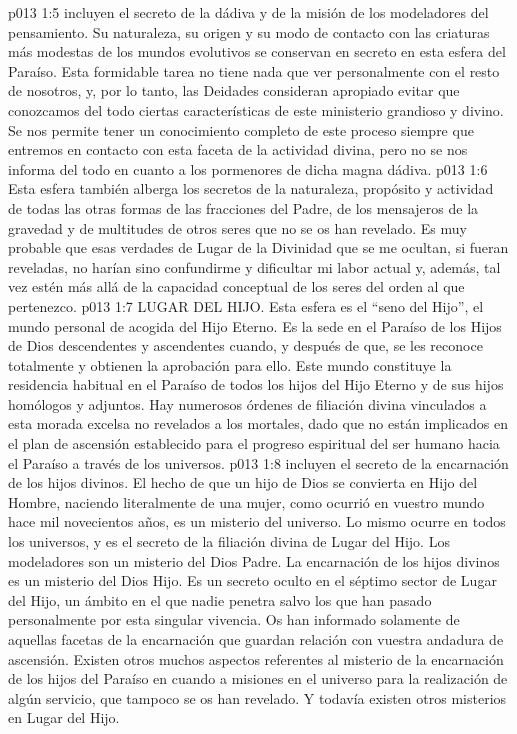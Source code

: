 \vs p013 1:5 \pc {} incluyen el secreto de la dádiva y de la misión de los modeladores del pensamiento. Su naturaleza, su origen y su modo de contacto con las criaturas más modestas de los mundos evolutivos se conservan en secreto en esta esfera del Paraíso. Esta formidable tarea no tiene nada que ver personalmente con el resto de nosotros, y, por lo tanto, las Deidades consideran apropiado evitar que conozcamos del todo ciertas características de este ministerio grandioso y divino. Se nos permite tener un conocimiento completo de este proceso siempre que entremos en contacto con esta faceta de la actividad divina, pero no se nos informa del todo en cuanto a los pormenores de dicha magna dádiva.
\vs p013 1:6 Esta esfera también alberga los secretos de la naturaleza, propósito y actividad de todas las otras formas de las fracciones del Padre, de los mensajeros de la gravedad y de multitudes de otros seres que no se os han revelado. Es muy probable que esas verdades de Lugar de la Divinidad que se me ocultan, si fueran reveladas, no harían sino confundirme y dificultar mi labor actual y, además, tal vez estén más allá de la capacidad conceptual de los seres del orden al que pertenezco.
\vs p013 1:7 LUGAR DEL HIJO. Esta esfera es el “seno del Hijo”, el mundo personal de acogida del Hijo Eterno. Es la sede en el Paraíso de los Hijos de Dios descendentes y ascendentes cuando, y después de que, se les reconoce totalmente y obtienen la aprobación para ello. Este mundo constituye la residencia habitual en el Paraíso de todos los hijos del Hijo Eterno y de sus hijos homólogos y adjuntos. Hay numerosos órdenes de filiación divina vinculados a esta morada excelsa no revelados a los mortales, dado que no están implicados en el plan de ascensión establecido para el progreso espiritual del ser humano hacia el Paraíso a través de los universos.
\vs p013 1:8 \pc {} incluyen el secreto de la encarnación de los hijos divinos. El hecho de que un hijo de Dios se convierta en Hijo del Hombre, naciendo literalmente de una mujer, como ocurrió en vuestro mundo hace mil novecientos años, es un misterio del universo. Lo mismo ocurre en todos los universos, y es el secreto de la filiación divina de Lugar del Hijo. Los modeladores son un misterio del Dios Padre. La encarnación de los hijos divinos es un misterio del Dios Hijo. Es un secreto oculto en el séptimo sector de Lugar del Hijo, un ámbito en el que nadie penetra salvo los que han pasado personalmente por esta singular vivencia. Os han informado solamente de aquellas facetas de la encarnación que guardan relación con vuestra andadura de ascensión. Existen otros muchos aspectos referentes al misterio de la encarnación de los hijos del Paraíso en cuando a misiones en el universo para la realización de algún servicio, que tampoco se os han revelado. Y todavía existen otros misterios en Lugar del Hijo.
